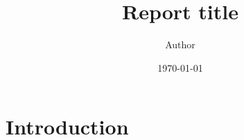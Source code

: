 \documentclass[pdf,color]{UCLnote}
\author{Author}
\title{Report title}
\date{\today}
\begin{document}
\maketitle

\section{Introduction}




\end{document}
